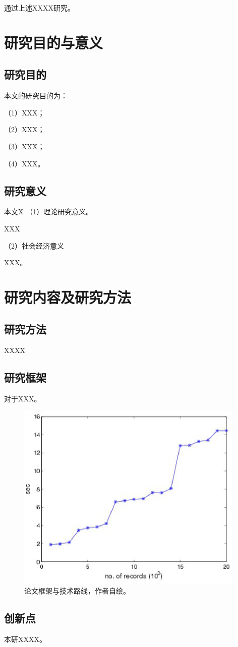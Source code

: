 通过上述XXXX研究。

\section{研究目的与意义}
\subsection{研究目的}

本文的研究目的为：

（1）XXX；

（2）XXX；

（3）XXX；

（4）XXX。


\subsection{研究意义}

本文X
（1）理论研究意义。

XXX

（2）社会经济意义

XXX。


\section{研究内容及研究方法}
\subsection{研究方法}

XXXX




\subsection{研究框架}
对于XXX。

\begin{figure}[b]
\centering
\includegraphics[width=0.98\textwidth]{phd_figures/dataSize.eps}
\caption{论文框架与技术路线，作者自绘。}\label{fig:Chapter1-lilun-kuangjia}
\vspace{\baselineskip} %
\end{figure}

\subsection{创新点}

本研XXXX。







